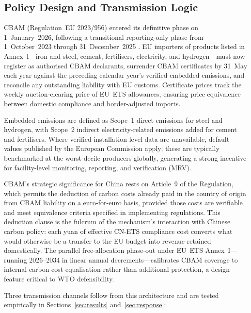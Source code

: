 \documentclass[letterpaper, 10pt, conference]{ieeeconf}
\begin{document}
\subsection{Policy Design and Transmission Logic}
\label{sec:channels}

CBAM (Regulation~EU 2023/956) entered its definitive phase on
1~January~2026, following a transitional reporting-only phase from
1~October~2023 through 31~December~2025 \citep{EURegulation2023}. EU
importers of products listed in Annex~I---iron and steel,
cement, fertilisers, electricity, and hydrogen---must now register as
authorised CBAM declarants, surrender CBAM certificates by 31~May
each year against the preceding calendar year's verified embedded
emissions, and reconcile any outstanding liability with EU customs.
Certificate prices track the weekly auction-clearing price of EU~ETS
allowances, ensuring price equivalence between domestic compliance
and border-adjusted imports.

Embedded emissions are defined as Scope~1 direct emissions for steel
and hydrogen, with Scope~2 indirect electricity-related
emissions added for cement and fertilisers. Where verified
installation-level data are unavailable, default values published by
the European Commission apply; these are typically benchmarked at the
worst-decile producers globally, generating a strong incentive for
facility-level monitoring, reporting, and verification (MRV).

CBAM's strategic significance for China rests on Article~9 of the
Regulation, which permits the deduction of carbon costs already paid
in the country of origin from CBAM liability on a euro-for-euro basis,
provided those costs are verifiable and meet equivalence criteria
specified in implementing regulations. This deduction clause is the
fulcrum of the mechanism's interaction with Chinese carbon policy:
each yuan of effective CN-ETS compliance cost converts what would
otherwise be a transfer to the EU budget into revenue retained
domestically. The parallel free-allocation phase-out under EU~ETS
Annex~I---running 2026--2034 in linear annual decrements---calibrates
CBAM coverage to internal carbon-cost equalisation rather than
additional protection, a design feature critical to WTO defensibility.

Three transmission channels follow from this architecture and are
tested empirically in Sections~\ref{sec:results} and~\ref{sec:response}:
\end{document}
